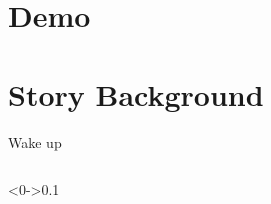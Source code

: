 \documentclass[notheorems]{beamer}
\begin{document}
\section{Demo}

\section{Story Background}

\begin{framenl}{Wake up}
\begin{columns}[T]
	\begin{column}<0->{0.1\textwidth}
		\begin{figure}[thpb]
			\centering
\end{figure}
\end{column}
\end{columns}
\end{framenl}
\end{document}
